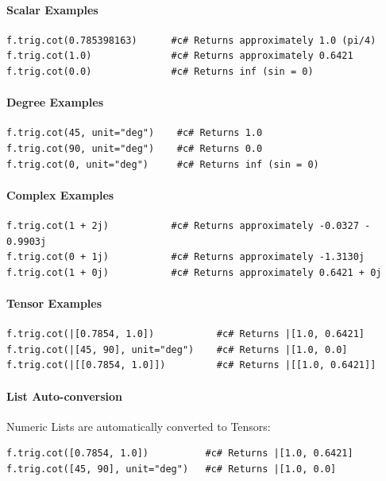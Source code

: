 \paragraph{Scalar Examples}
\begin{verbatim}
f.trig.cot(0.785398163)      #c# Returns approximately 1.0 (pi/4)
f.trig.cot(1.0)              #c# Returns approximately 0.6421
f.trig.cot(0.0)              #c# Returns inf (sin = 0)
\end{verbatim}

\paragraph{Degree Examples}
\begin{verbatim}
f.trig.cot(45, unit="deg")    #c# Returns 1.0
f.trig.cot(90, unit="deg")    #c# Returns 0.0
f.trig.cot(0, unit="deg")     #c# Returns inf (sin = 0)
\end{verbatim}

\paragraph{Complex Examples}
\begin{verbatim}
f.trig.cot(1 + 2j)           #c# Returns approximately -0.0327 - 0.9903j
f.trig.cot(0 + 1j)           #c# Returns approximately -1.3130j
f.trig.cot(1 + 0j)           #c# Returns approximately 0.6421 + 0j
\end{verbatim}

\paragraph{Tensor Examples}
\begin{verbatim}
f.trig.cot(|[0.7854, 1.0])           #c# Returns |[1.0, 0.6421]
f.trig.cot(|[45, 90], unit="deg")    #c# Returns |[1.0, 0.0]
f.trig.cot(|[[0.7854, 1.0]])         #c# Returns |[[1.0, 0.6421]]
\end{verbatim}

\paragraph{List Auto-conversion}
Numeric Lists are automatically converted to Tensors:
\begin{verbatim}
f.trig.cot([0.7854, 1.0])          #c# Returns |[1.0, 0.6421]
f.trig.cot([45, 90], unit="deg")   #c# Returns |[1.0, 0.0]
\end{verbatim}

